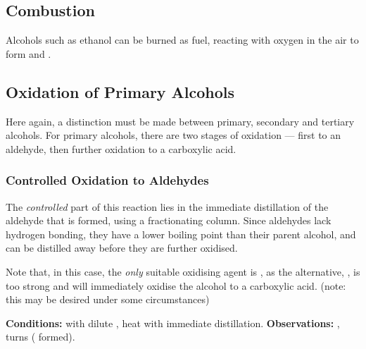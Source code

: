 		\pagebreak
		\subsection{Combustion}

			Alcohols such as ethanol can be burned as fuel, reacting with oxygen in the air to form  and .



		\subsection{Oxidation of Primary Alcohols}

			Here again, a distinction must be made between primary, secondary and tertiary alcohols. For primary alcohols, there
			are two stages of oxidation --- first to an aldehyde, then further oxidation to a carboxylic acid.

			\hypertarget{OxidationOfPrimaryAlcohols}{}
			\subsubsection{Controlled Oxidation to Aldehydes}

				The \textit{controlled} part of this reaction lies in the immediate distillation of the aldehyde that is formed, using
				a fractionating column. Since aldehydes lack hydrogen bonding, they have a lower boiling point than their parent alcohol,
				and can be distilled away before they are further oxidised.

				Note that, in this case, the \textit{only} suitable oxidising agent is , as the alternative, , is
				too strong and will immediately oxidise the alcohol to a carboxylic acid. (note: this may be desired under some circumstances)


				\vspace{1.5em}
				\vbox{\textbf{Conditions:}	\tabto{35mm} with dilute ,
											\tabto{35mm}heat with immediate distillation.}
				\vspace{0.75em}
				\vbox{\textbf{Observations:}\tabto{35mm} , turns 
														( formed).}

